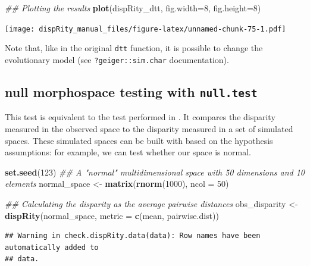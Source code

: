 \documentclass[]{book}
\newenvironment{Shaded}{\begin{snugshade}}{\end{snugshade}}
\newcommand{\CommentTok}[1]{\textcolor[rgb]{0.56,0.35,0.01}{\textit{#1}}}
\newcommand{\DataTypeTok}[1]{\textcolor[rgb]{0.13,0.29,0.53}{#1}}
\newcommand{\DecValTok}[1]{\textcolor[rgb]{0.00,0.00,0.81}{#1}}
\newcommand{\KeywordTok}[1]{\textcolor[rgb]{0.13,0.29,0.53}{\textbf{#1}}}
\newcommand{\NormalTok}[1]{#1}
\newcommand{\StringTok}[1]{\textcolor[rgb]{0.31,0.60,0.02}{#1}}
\begin{document}
\begin{Shaded}
\begin{Highlighting}[]
\CommentTok{## Plotting the results}
\KeywordTok{plot}\NormalTok{(dispRity_dtt, }\DataTypeTok{fig.width=}\DecValTok{8}\NormalTok{, }\DataTypeTok{fig.height=}\DecValTok{8}\NormalTok{)}
\end{Highlighting}
\end{Shaded}

\texttt{[image: dispRity\_manual\_files/figure-latex/unnamed-chunk-75-1.pdf]}

Note that, like in the original \texttt{dtt} function, it is possible to change the evolutionary model (see \texttt{?geiger::sim.char} documentation).

\hypertarget{null-test}{%
\subsection{\texorpdfstring{null morphospace testing with \texttt{null.test}}{null morphospace testing with null.test}}\label{null-test}}

This test is equivalent to the test performed in \citet{diaz2016global}.
It compares the disparity measured in the observed space to the disparity measured in a set of simulated spaces.
These simulated spaces can be built with based on the hypothesis assumptions: for example, we can test whether our space is normal.

\begin{Shaded}
\begin{Highlighting}[]
\KeywordTok{set.seed}\NormalTok{(}\DecValTok{123}\NormalTok{)}
\CommentTok{## A "normal" multidimensional space with 50 dimensions and 10 elements}
\NormalTok{normal_space <-}\StringTok{ }\KeywordTok{matrix}\NormalTok{(}\KeywordTok{rnorm}\NormalTok{(}\DecValTok{1000}\NormalTok{), }\DataTypeTok{ncol =} \DecValTok{50}\NormalTok{)}

\CommentTok{## Calculating the disparity as the average pairwise distances}
\NormalTok{obs_disparity <-}\StringTok{ }\KeywordTok{dispRity}\NormalTok{(normal_space,}
                          \DataTypeTok{metric =} \KeywordTok{c}\NormalTok{(mean, pairwise.dist))}
\end{Highlighting}
\end{Shaded}

\begin{verbatim}
## Warning in check.dispRity.data(data): Row names have been automatically added to
## data.
\end{verbatim}
\end{document}
